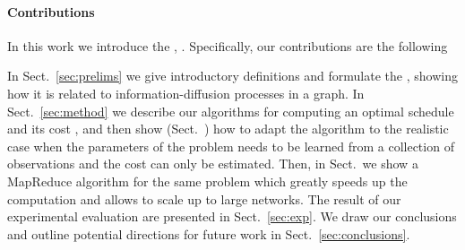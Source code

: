 \paragraph*{Contributions}
In this work we introduce the \probname, .  Specifically, our
contributions are the following

\begin{itemize*}
	\item {}
\end{itemize*}

 In Sect.~\ref{sec:prelims} we give introductory
definitions and formulate the \probname, showing how it is related to
information-diffusion processes in a graph. In Sect.~\ref{sec:method} we
describe our algorithms for computing an optimal schedule and its cost
, and then show
(Sect.~) how to adapt the algorithm to the realistic case when the
parameters of the problem needs to be learned from a collection of observations
and the cost can only be estimated. Then, in Sect.~ we show a
MapReduce algorithm for the same problem which greatly speeds up the computation
and allows to scale up to large networks. The result of our experimental
evaluation are presented in Sect.~\ref{sec:exp}. We draw our conclusions and
outline potential directions for future work in Sect.~\ref{sec:conclusions}.
